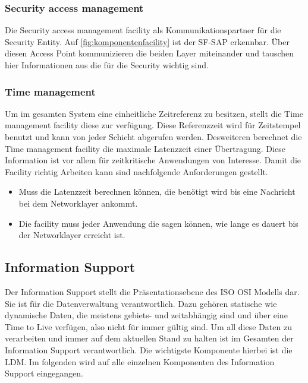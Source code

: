 \subsubsection{Security access management \label{facilitylayer_AccessManagement}}
Die Security access management facility als Kommunikationspartner für die Security Entity. Auf \autoref{fig:komponentenfacility} ist der SF-SAP erkennbar. Über diesen Access Point kommunizieren die beiden Layer miteinander und tauschen hier Informationen aus die für die Security wichtig sind. 

\subsubsection{Time management \label{facilitylayer_TimeManagement}}
Um im gesamten System eine einheitliche Zeitreferenz zu besitzen, stellt die Time management facility diese zur verfügung. Diese Referenzzeit wird für Zeitstempel benutzt und kann von jeder Schicht abgerufen werden. Desweiteren  berechnet die Time management facility die maximale Latenzzeit einer Übertragung. Diese Information ist vor allem für zeitkritische Anwendungen von Interesse.
Damit die Facility richtig Arbeiten kann sind nachfolgende Anforderungen gestellt.
\begin{itemize}
\item Muss die Latenzzeit berechnen können, die benötigt wird bis eine Nachricht bei dem Networklayer ankommt. 
\item Die facility muss jeder Anwendung die sagen können, wie lange es dauert bis der Networklayer erreicht ist. 
\end{itemize}

\subsection{Information Support}
Der Information Support stellt die Präsentationsebene des \ac{ISO} \ac{OSI} Modells dar. Sie ist für die Datenverwaltung verantwortlich. Dazu gehören statische wie dynamische Daten, die meistens gebiets- und zeitabhängig sind und über eine Time to Live verfügen, also nicht für immer gültig sind. Um all diese Daten zu verarbeiten und immer auf dem aktuellen Stand zu halten ist im Gesamten der Information Support verantwortlich. Die wichtigste Komponente hierbei ist die \ac{LDM}. Im folgenden wird auf alle einzelnen Komponenten des Information Support eingegangen. 

